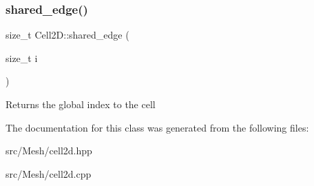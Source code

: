 \subsubsection{\texorpdfstring{shared\+\_\+edge()}{shared\_edge()}}
{\footnotesize\ttfamily size\+\_\+t Cell2\+D\+::shared\+\_\+edge (\begin{DoxyParamCaption}\item[{size\+\_\+t}]{i }\end{DoxyParamCaption})}

Returns the global index to the cell 

The documentation for this class was generated from the following files\+:\begin{DoxyCompactItemize}
\item 
src/\+Mesh/cell2d.\+hpp\item 
src/\+Mesh/cell2d.\+cpp\end{DoxyCompactItemize}
